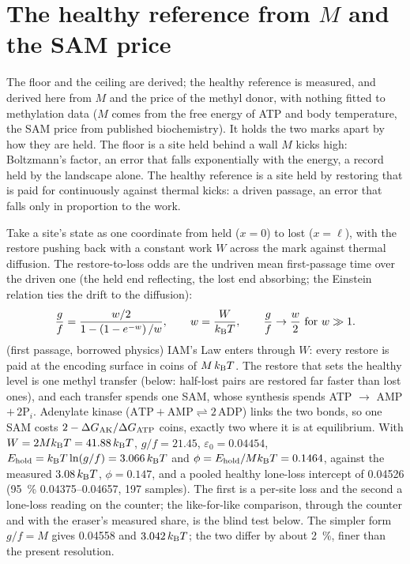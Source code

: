 \section{The healthy reference from $M$ and the SAM price}\label{sec:middle_candidate}

The floor and the ceiling are derived; the healthy reference is measured, and derived here from $M$ and the price of the methyl donor, with nothing fitted to
methylation data ($M$ comes from the free energy of ATP and body temperature, the SAM price from published biochemistry). \derived{} It holds the two marks apart by how
they are held. The floor is a site held behind a wall $M$ kicks high: Boltzmann's factor, an error that falls exponentially with the
energy, a record held by the landscape alone. The healthy reference is a site held by restoring that is paid for continuously against
thermal kicks: a driven passage, an error that falls only in proportion to the work. \interp

Take a site's state as one coordinate from held ($x=0$) to lost ($x=\ell$), with the restore pushing back with a constant work $W$ across
the mark against thermal diffusion. The restore-to-loss odds are the undriven mean first-passage time over the driven one (the held end
reflecting, the lost end absorbing; the Einstein relation ties the drift to the diffusion):
\begin{equation}
  \frac{g}{f}=\frac{w/2}{1-\left(1-e^{-w}\right)/w},\qquad w=\frac{W}{k_{\mathrm B} T},\qquad \frac{g}{f}\to\frac{w}{2}\ \text{for}\ w\gg1 .
  \label{eq:middle_passage}
\end{equation}
\derived{} (first passage, borrowed physics) IAM's Law enters through $W$: every restore is paid at the encoding surface in coins of
$M\,k_{\mathrm B} T$. The restore that sets the healthy level is one methyl transfer (below: half-lost pairs are restored far faster than lost
ones), and each transfer spends one SAM, whose synthesis spends ATP $\to$ AMP $+\,2$P$_i$. Adenylate kinase ($\mathrm{ATP}+\mathrm{AMP}\rightleftharpoons2\,\mathrm{ADP}$) links
the two bonds, so one SAM costs $2-\Delta G_{\rm AK}/\Delta G_{\rm ATP}$ coins, exactly two where it is at equilibrium. \derived{} With $W=2Mk_{\mathrm B} T=41.88\,k_{\mathrm B} T$, $g/f=21.45$, $\varepsilon_0=0.04454$, $E_{\rm hold}=k_{\mathrm B} T\ln(g/f)=3.066\,k_{\mathrm B} T$ and $\phi=E_{\rm hold}/Mk_{\mathrm B} T=0.1464$, against the measured
$3.08\,k_{\mathrm B} T$, $\phi=0.147$, and a pooled healthy lone-loss intercept of 0.04526 (95~\% 0.04375--0.04657, 197 samples). The first is a per-site loss and the second a lone-loss reading on the counter; the like-for-like comparison, through the counter and with the eraser's measured share, is the blind test below. \derived{}
The simpler form $g/f=M$ gives 0.04558 and $3.042\,k_{\mathrm B} T$; the two differ by about 2~\%, finer than the present resolution.

